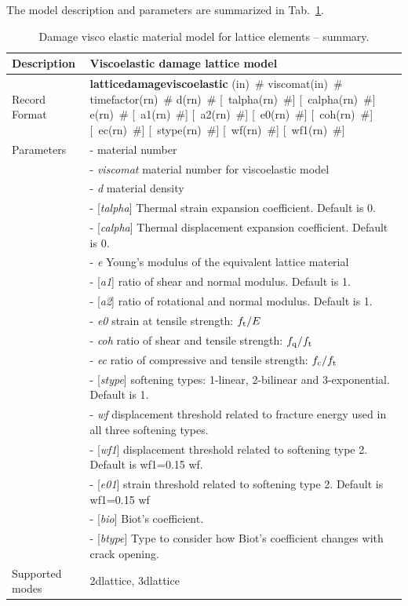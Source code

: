 \documentclass[a4paper]{article}
\newcommand{\descitem}[1]{{\noindent \bf #1}}
\newcommand{\elemparam}[2]{{{#1\tiny (#2)}~\#}}
\newcommand{\optelemparam}[2]{[{~\elemparam{#1}{#2}}]}
\newcommand{\param}[1]{{\it #1}}
\newcommand{\optparam}[1]{[{\it #1}]}
\newenvironment{mmt}{\begin{tabular}{|l|p{9cm}|}}{\end{tabular}\\}
\newenvironment{mmt}{\begin{tabular}{|l|l|}}{\end{tabular}\\}
\begin{document}
The model description and parameters are summarized in Tab.~\ref{latticedamageviscoelastic_table}.

\begin{table}[!htb]
\begin{mmt}
\hline
Description & Viscoelastic damage lattice model\\
\hline
Record Format & \descitem{latticedamageviscoelastic} \elemparam{}{in} 
\elemparam{viscomat}{in} \elemparam{timefactor}{rn} \elemparam{d}{rn} \optelemparam{talpha}{rn} \optelemparam{calpha}{rn} \elemparam{e}{rn} \optelemparam{a1}{rn} \optelemparam{a2}{rn} \optelemparam{e0}{rn}  \optelemparam{coh}{rn} \optelemparam{ec}{rn} \optelemparam{stype}{rn} \optelemparam{wf}{rn} \optelemparam{wf1}{rn}\\
Parameters &- \param{} material number\\
&- \param{viscomat} material number for viscoelastic model\\
&- \param{d} material density\\
&- \optparam{talpha} Thermal strain expansion coefficient. Default is 0.\\
&- \optparam{calpha} Thermal displacement expansion coefficient. Default is 0.\\
&- \param{e} Young's modulus of the equivalent lattice material\\
&- \optparam{a1} ratio of shear and normal modulus. Default is 1.\\
&- \optparam{a2} ratio of rotational and normal modulus. Default is 1.\\
&- \param{e0} strain at tensile strength: $f_{\rm t}/E$\\
&- \param{coh} ratio of shear and tensile strength: $f_{\rm q}/f_{\rm t}$\\
&- \param{ec} ratio of compressive and tensile strength: $f_{\rm c}/f_{\rm t}$\\
&- \optparam{stype} softening types: 1-linear, 2-bilinear and 3-exponential. Default is 1.\\
&- \param{wf} displacement threshold related to fracture energy used in all three softening types.\\
&- \optparam{wf1} displacement threshold related to softening type 2. Default is wf1=0.15 wf.\\
&- \optparam{e01} strain threshold related to softening type 2. Default is wf1=0.15 wf\\
&- \optparam{bio} Biot's coefficient.\\
&- \optparam{btype} Type to consider how Biot's coefficient changes with crack opening.\\
Supported modes & 2dlattice, 3dlattice\\
\hline
\end{mmt}
\caption{Damage visco elastic material model for lattice elements -- summary.}
\label{latticedamageviscoelastic_table}
\end{table}
\end{document}
